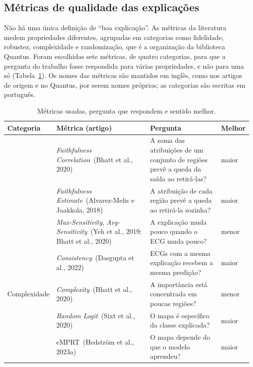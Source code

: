 \documentclass[11pt,a4paper]{article}
\newcommand{\fonte}[1]{\par\vspace{2pt}{\centering\footnotesize Fonte: #1\par}}
\newcommand{\FC}{\textit{Faithfulness Correlation}}
\newcommand{\FE}{\textit{Faithfulness Estimate}}
\newcommand{\MS}{\textit{Max-Sensitivity}}
\newcommand{\AS}{\textit{Avg-Sensitivity}}
\newcommand{\CX}{\textit{Complexity}}
\newcommand{\CS}{\textit{Consistency}}
\newcommand{\RL}{\textit{Random Logit}}
\newcommand{\EM}{eMPRT}
\begin{document}
\subsection{Métricas de qualidade das explicações}\label{sec:metricas}

Não há uma única definição de ``boa explicação''. As métricas da literatura medem propriedades diferentes, agrupadas em categorias como fidelidade, robustez, complexidade e randomização, que é a organização da biblioteca Quantus. Foram escolhidas sete métricas, de quatro categorias, para que a pergunta do trabalho fosse respondida para várias propriedades, e não para uma só (Tabela~\ref{tab:metricas}). Os nomes das métricas são mantidos em inglês, como nos artigos de origem e no Quantus, por serem nomes próprios; as categorias são escritas em português.

\begin{table}[H]\centering\small
\caption{Métricas usadas, pergunta que respondem e sentido melhor.}\label{tab:metricas}
\begin{tabularx}{\linewidth}{>{\raggedright\arraybackslash}p{2.1cm}>{\raggedright\arraybackslash}p{3.7cm}X>{\centering\arraybackslash}p{1.4cm}}
\toprule
\textbf{Categoria} & \textbf{Métrica (artigo)} & \textbf{Pergunta} & \textbf{Melhor} \\
\midrule
\multirow{2}{*}{Fidelidade} & \FC\ (Bhatt et al., 2020) & A soma das atribuições de um conjunto de regiões prevê a queda da saída ao retirá-las? & maior \\
 & \FE\ (Alvarez-Melis e Jaakkola, 2018) & A atribuição de cada região prevê a queda ao retirá-la sozinha? & maior \\ \addlinespace
\multirow{2}{*}{Robustez} & \MS, \AS\ (Yeh et al., 2019; Bhatt et al., 2020) & A explicação muda pouco quando o ECG muda pouco? & menor \\
 & \CS\ (Dasgupta et al., 2022) & ECGs com a mesma explicação recebem a mesma predição? & maior \\ \addlinespace
Complexidade & \CX\ (Bhatt et al., 2020) & A importância está concentrada em poucas regiões? & menor \\ \addlinespace
\multirow{2}{*}{Randomização} & \RL\ (Sixt et al., 2020) & O mapa é específico da classe explicada? & maior \\
 & \EM\ (Hedström et al., 2023a) & O mapa depende do que o modelo aprendeu? & maior \\
\bottomrule
\end{tabularx}
\fonte{Elaborado pelo autor.}
\end{table}
\end{document}
